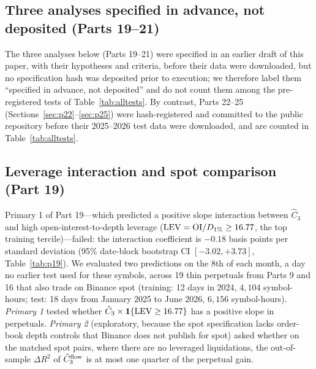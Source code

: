 \FloatBarrier

\subsection{Three analyses specified in advance, not deposited (Parts 19--21)}\label{sec:p1921}
The three analyses below (Parts 19--21) were specified in an earlier draft of this paper, with their hypotheses and criteria, before their data were downloaded, but no specification hash was deposited prior to execution; we therefore label them ``specified in advance, not deposited'' and do not count them among the pre-registered tests of Table~\ref{tab:alltests}. By contrast, Parts 22--25 (Sections~\ref{sec:p22}--\ref{sec:p25}) were hash-registered and committed to the public repository before their 2025--2026 test data were downloaded, and are counted in Table~\ref{tab:alltests}.

\subsection{Leverage interaction and spot comparison (Part 19)}\label{sec:p19}
Primary 1 of Part 19---which predicted a positive slope interaction between $\hat C_3$ and high open-interest-to-depth leverage (${\rm LEV}={\rm OI}/D_{1\%}\ge16.77$, the top training tercile)---failed: the interaction coefficient is $-0.18$ basis points per standard deviation (95\% date-block bootstrap CI $[-3.02,+3.73]$, Table~\ref{tab:p19}). We evaluated two predictions on the 8th of each month, a day no earlier test used for these symbols, across 19 thin perpetuals from Parts 9 and 16 that also trade on Binance spot (training: 12 days in 2024, $4{,}104$ symbol-hours; test: 18 days from January 2025 to June 2026, $6{,}156$ symbol-hours). \emph{Primary 1} tested whether $\hat C_3\times\mathbf{1}\{{\rm LEV}\ge16.77\}$ has a positive slope in perpetuals. \emph{Primary 2} (exploratory, because the spot specification lacks order-book depth controls that Binance does not publish for spot) asked whether on the matched spot pairs, where there are no leveraged liquidations, the out-of-sample $\Delta R^2$ of $\hat C_3^{\rm flow}$ is at most one quarter of the perpetual gain.

